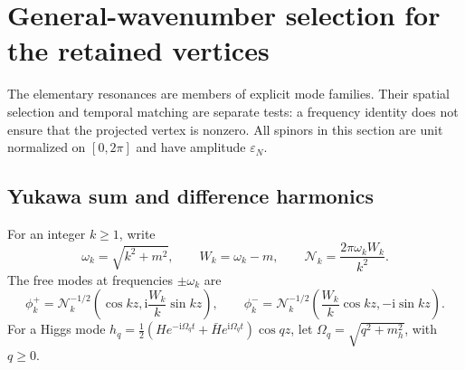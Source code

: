 \documentclass[11pt,a4paper,oneside]{book}
\theoremstyle{plain}
\theoremstyle{definition}
\theoremstyle{remark}
\newcommand{\ii}{\mathrm i}
\begin{document}
\section{General-wavenumber selection for the retained vertices}
\label{sec:general-triads}
The elementary resonances are members of explicit mode families.  Their
spatial selection and temporal matching are separate tests: a frequency
identity does not ensure that the projected vertex is nonzero.  All
spinors in this section are unit normalized on $[0,2\pi]$ and have
amplitude $\varepsilon_N$.

\subsection{Yukawa sum and difference harmonics}
For an integer $k\ge1$, write
\begin{equation}
 \omega_k=\sqrt{k^2+m^2},\qquad W_k=\omega_k-m,\qquad
 \mathcal N_k=\frac{2\pi\omega_kW_k}{k^2}.
 \label{eq:general-spinor-normalization}
\end{equation}
The free modes at frequencies $\pm\omega_k$ are
\begin{equation}
 \phi_k^+=\mathcal N_k^{-1/2}
       \left(\cos kz,\ii\frac{W_k}{k}\sin kz\right),\qquad
 \phi_k^-=\mathcal N_k^{-1/2}
       \left(\frac{W_k}{k}\cos kz,-\ii\sin kz\right).
 \label{eq:general-yukawa-modes}
\end{equation}
For a Higgs mode
$h_q=\tfrac12(H e^{-\ii\Omega_qt}+\bar H e^{\ii\Omega_qt})\cos qz$,
let $\Omega_q=\sqrt{q^2+m_h^2}$, with $q\ge0$.
\end{document}
